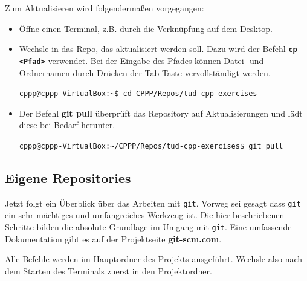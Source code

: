 Zum Aktualisieren wird folgendermaßen vorgegangen:

\begin{itemize}
\item Öffne einen Terminal, z.B. durch die Verknüpfung auf dem Desktop.
\item Wechsle in das Repo, das aktualisiert werden soll.
Dazu wird der Befehl \textbf{\texttt{cp <Pfad>}} verwendet.
Bei der Eingabe des Pfades können Datei- und Ordnernamen durch Drücken der Tab-Taste vervollständigt werden.

\texttt{cppp@cppp-VirtualBox:\textasciitilde\$ cd CPPP/Repos/tud-cpp-exercises}

\item Der Befehl \textbf{git pull} überprüft das Repository auf Aktualisierungen und lädt diese bei Bedarf herunter.

\texttt{cppp@cppp-VirtualBox:\textasciitilde/CPPP/Repos/tud-cpp-exercises\$ git pull}
\end{itemize}

\subsection{Eigene Repositories}
Jetzt folgt ein Überblick über das Arbeiten mit \texttt{git}.
Vorweg sei gesagt dass \texttt{git} ein sehr mächtiges und umfangreiches Werkzeug ist. Die hier beschriebenen Schritte bilden die absolute Grundlage im Umgang mit \texttt{git}. Eine umfassende Dokumentation gibt es auf der Projektseite \textbf{git-scm.com}.

Alle Befehle werden im Hauptordner des Projekts ausgeführt. Wechsle also nach dem Starten des Terminals zuerst in den Projektordner.

